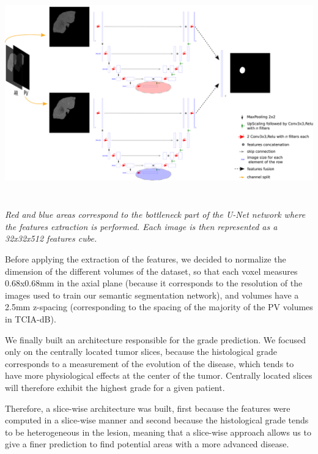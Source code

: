 \documentclass[]{article}
\begin{document}
\includegraphics[width=6.26772in,height=3.56944in]{./images/media/image22.png}

\emph{Red and blue areas correspond to the bottleneck part of the U-Net
network where the features extraction is performed. Each image is then
represented as a 32x32x512 features cube.}

Before applying the extraction of the features, we decided to normalize
the dimension of the different volumes of the dataset, so that each
voxel measures 0.68x0.68mm in the axial plane (because it corresponds to
the resolution of the images used to train our semantic segmentation
network), and volumes have a 2.5mm z-spacing (corresponding to the
spacing of the majority of the PV volumes in TCIA-dB).

We finally built an architecture responsible for the grade prediction.
We focused only on the centrally located tumor slices, because the
histological grade corresponds to a measurement of the evolution of the
disease, which tends to have more physiological effects at the center of
the tumor. Centrally located slices will therefore exhibit the highest
grade for a given patient.

Therefore, a slice-wise architecture was built, first because the
features were computed in a slice-wise manner and second because the
histological grade tends to be heterogeneous in the lesion, meaning that
a slice-wise approach allows us to give a finer prediction to find
potential areas with a more advanced disease.
\end{document}
